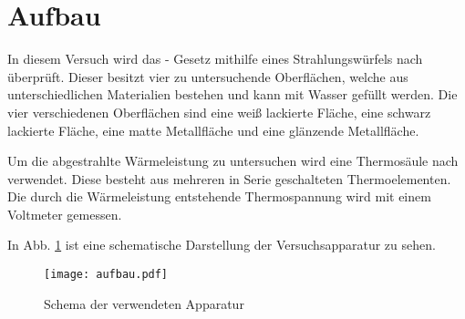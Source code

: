 
\section{Aufbau} 

In diesem Versuch wird das - Gesetz
mithilfe eines Strahlungswürfels nach  überprüft. Dieser
besitzt vier zu untersuchende Oberflächen, welche aus unterschiedlichen
Materialien bestehen und kann mit Wasser gefüllt werden. Die vier
verschiedenen Oberflächen sind eine weiß lackierte Fläche, eine schwarz
lackierte Fläche, eine matte Metallfläche und eine glänzende
Metallfläche.

Um die abgestrahlte Wärmeleistung zu untersuchen wird eine Thermosäule
nach  verwendet.  Diese besteht aus mehreren in Serie
geschalteten Thermoelementen. Die durch die Wärmeleistung entstehende
Thermospannung wird mit einem Voltmeter gemessen.

In Abb. \ref{fig:aufbau} ist eine schematische Darstellung der Versuchsapparatur zu sehen.
%
\begin{figure}
  \centering
  \texttt{[image: aufbau.pdf]}
  \caption{Schema der verwendeten Apparatur}
  \label{fig:aufbau}
\end{figure}
%

